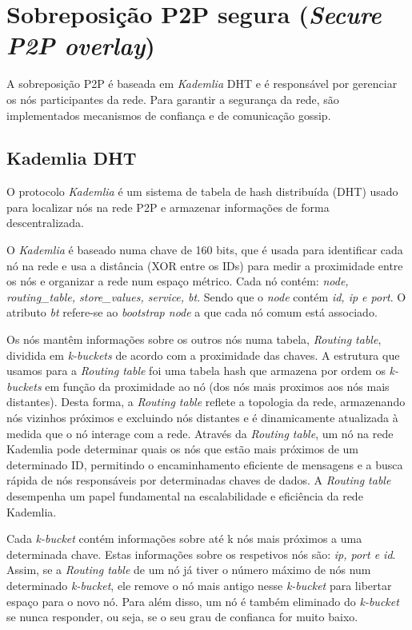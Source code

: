 \documentclass[conference]{IEEEtran}
\begin{document}
    \section{Sobreposição P2P segura (\textit{Secure P2P overlay})}

    A sobreposição P2P é baseada em \textit{Kademlia} DHT e é responsável por gerenciar os nós participantes da rede. Para garantir a segurança da rede, são implementados mecanismos de confiança e de comunicação gossip.

    \subsection{Kademlia DHT}
    O protocolo \textit{Kademlia} é um sistema de tabela de hash distribuída (DHT) usado para localizar nós na rede P2P e armazenar informações de forma descentralizada.

    O \textit{Kademlia} é baseado numa chave de 160 bits, que é usada para identificar cada nó na rede e usa a distância (XOR entre os IDs) para medir a proximidade entre os nós e organizar a rede num espaço métrico. Cada nó contém: \textit{node, routing\_table, store\_values, service, bt}. Sendo que o \textit{node} contém \textit{id, ip e port}. O atributo \textit{bt} refere-se ao \textit{bootstrap node} a que cada nó comum está associado.

    Os nós mantêm informações sobre os outros nós numa tabela, \textit{Routing table}, dividida em \textit{k-buckets} de acordo com a proximidade das chaves. A estrutura que usamos para a \textit{Routing table} foi uma tabela hash que armazena por ordem os \textit{k-buckets} em função da proximidade ao nó (dos nós mais proximos aos nós mais distantes). Desta forma, a \textit{Routing table} reflete a topologia da rede, armazenando nós vizinhos próximos e excluindo nós distantes e é dinamicamente atualizada à medida que o nó interage com a rede.
    Através da \textit{Routing table}, um nó na rede Kademlia pode determinar quais os nós que estão mais próximos de um determinado ID, permitindo o encaminhamento eficiente de mensagens e a busca rápida de nós responsáveis por determinadas chaves de dados. A \textit{Routing table} desempenha um papel fundamental na escalabilidade e eficiência da rede Kademlia.

    Cada \textit{k-bucket} contém informações sobre até k nós mais próximos a uma determinada chave. Estas informações sobre os respetivos nós são: \textit{ip, port e id}.
    Assim, se a \textit{Routing table} de um nó já tiver o número máximo de nós num determinado \textit{k-bucket}, ele remove o nó mais antigo nesse \textit{k-bucket} para libertar espaço para o novo nó. Para além disso, um nó é também eliminado do \textit{k-bucket} se nunca responder, ou seja, se o seu grau de confianca for muito baixo.
\end{document}

